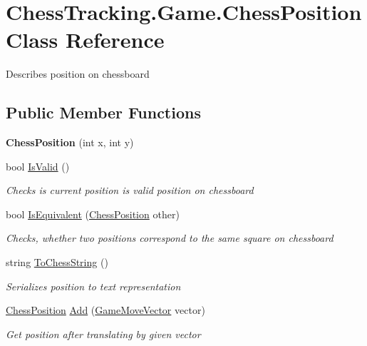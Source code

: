 \hypertarget{class_chess_tracking_1_1_game_1_1_chess_position}{}\section{Chess\+Tracking.\+Game.\+Chess\+Position Class Reference}
\label{class_chess_tracking_1_1_game_1_1_chess_position}


Describes position on chessboard  


\subsection*{Public Member Functions}
\begin{DoxyCompactItemize}
\item 
\mbox{\label{class_chess_tracking_1_1_game_1_1_chess_position_aa4cb1b1a3efa6f96b0e9553f61060d13}} 
{\bfseries Chess\+Position} (int x, int y)
\item 
bool \mbox{\hyperlink{class_chess_tracking_1_1_game_1_1_chess_position_ad09d6fdc1fdd5c5652deaea5c246f0b9}{Is\+Valid}} ()
\begin{DoxyCompactList}\small\item\em Checks is current position is valid position on chessboard \end{DoxyCompactList}\item 
bool \mbox{\hyperlink{class_chess_tracking_1_1_game_1_1_chess_position_adf336b10f5e5943de1423fd93517cf48}{Is\+Equivalent}} (\mbox{\hyperlink{class_chess_tracking_1_1_game_1_1_chess_position}{Chess\+Position}} other)
\begin{DoxyCompactList}\small\item\em Checks, whether two positions correspond to the same square on chessboard \end{DoxyCompactList}\item 
string \mbox{\hyperlink{class_chess_tracking_1_1_game_1_1_chess_position_aa65a17af184774b44f0631a8014e17d0}{To\+Chess\+String}} ()
\begin{DoxyCompactList}\small\item\em Serializes position to text representation \end{DoxyCompactList}\item 
\mbox{\hyperlink{class_chess_tracking_1_1_game_1_1_chess_position}{Chess\+Position}} \mbox{\hyperlink{class_chess_tracking_1_1_game_1_1_chess_position_acb0c72210d03873bf923d1b871e31b4b}{Add}} (\mbox{\hyperlink{class_chess_tracking_1_1_game_1_1_game_move_vector}{Game\+Move\+Vector}} vector)
\begin{DoxyCompactList}\small\item\em Get position after translating by given vector \end{DoxyCompactList}\end{DoxyCompactItemize}
